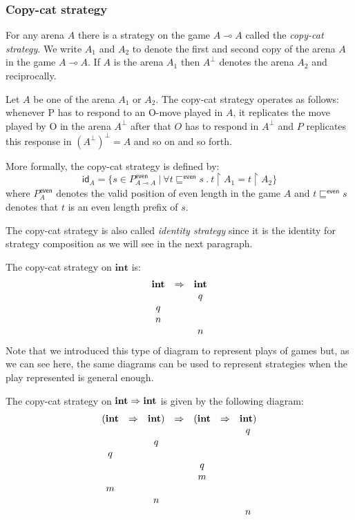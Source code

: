 \subsubsection{Copy-cat strategy}

For any arena $A$ there is a strategy on the game $A \multimap A$
called the \emph{copy-cat strategy}. We write $A_1$ and $A_2$ to
denote the first and second copy of the arena $A$ in the game $A
\multimap A$. If $A$ is the arena $A_1$ then $A^\perp$ denotes the
arena $A_2$ and reciprocally.

Let $A$ be one of the arena $A_1$ or $A_2$. The copy-cat strategy
operates as follows: whenever P has to respond to an O-move played
in $A$, it replicates the move played by O in the arena $A^{\perp}$
after that $O$ has to respond in $A^{\perp}$ and $P$ replicates this
response in $(A^\perp)^\perp = A$ and so on and so forth.


More formally, the copy-cat strategy is defined by:
$$ \textsf{id}_A = \{ s \in P^{\textsf{even}}_{A \multimap A} \ | \ \forall t \sqsubseteq^{\textsf{even}} s\ .\ t \upharpoonright A_1 = t \upharpoonright A_2 \}$$
where $P^{\textsf{even}}_A$ denotes the valid position of even
length in the game $A$ and $t \sqsubseteq^{\textsf{even}} s$ denotes
that $t$ is an even length prefix of $s$.

The copy-cat strategy is also called \emph{identity strategy} since
it is the identity for strategy composition as we will see in the
next paragraph.

\begin{exmp} The copy-cat strategy on $\textbf{int}$ is:
$$\begin{array}{ccc}
\textbf{int} & \Rightarrow & \textbf{int} \\
&& q\\
q \\
n \\
&& n
\end{array}
$$
Note that we introduced this type of diagram to represent plays of
games but, as we can see here, the same diagrams can be used to
represent strategies when the play represented is general enough.

The copy-cat strategy on $\textbf{int} \Rightarrow \textbf{int}$ is given
by the following diagram:
$$\begin{array}{ccccccc}
(\textbf{int} & \Rightarrow & \textbf{int}) & \Rightarrow & (\textbf{int} & \Rightarrow & \textbf{int}) \\
&&&& && q\\
&& q\\
q \\
&&&& q \\
&&&& m \\
m\\
&& n \\
&&&& && n
\end{array}$$
\end{exmp}

